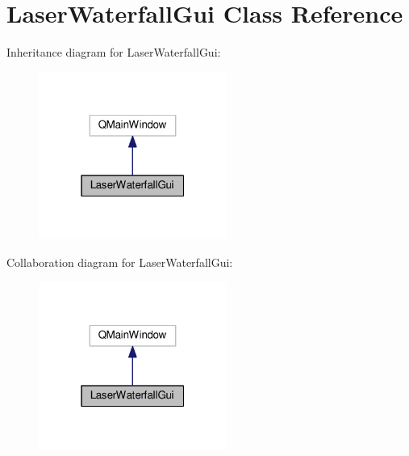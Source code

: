 \hypertarget{classLaserWaterfallGui}{}\section{Laser\+Waterfall\+Gui Class Reference}
\label{classLaserWaterfallGui}


Inheritance diagram for Laser\+Waterfall\+Gui\+:\nopagebreak
\begin{figure}[H]
\begin{center}
\leavevmode
\includegraphics[width=175pt]{classLaserWaterfallGui__inherit__graph}
\end{center}
\end{figure}


Collaboration diagram for Laser\+Waterfall\+Gui\+:\nopagebreak
\begin{figure}[H]
\begin{center}
\leavevmode
\includegraphics[width=175pt]{classLaserWaterfallGui__coll__graph}
\end{center}
\end{figure}
